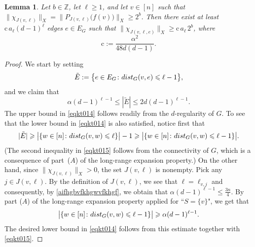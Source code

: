 \documentclass[11pt,leqno]{amsart}
\newtheorem{lemma}[theorem]{Lemma}
\theoremstyle{remark}
\theoremstyle{plain}
\newcommand{\Z}{\mathbb{Z}}
\def\dist{{\rm dist}}
\def\dist{{\rm dist}}
\begin{document}
\begin{lemma} \label{aifgvsifghvfihfgiw}
Let $b\in\Z$, let $\ell\geqslant 1$, and let $v\in [n]$ such that
$\|\chi_{J(v,\ell)}\|_X=\big\|P_{J(v,\ell)}\big(f(v)\big)\big\|_X\geqslant 2^b$.
Then there exist at least $\mathrm{c}\,a_\ell (d-1)^\ell$ edges $e\in E_G$ such that
$\|\chi_{J(v,\ell,e)}\|_X\geqslant \mathrm{c}\,a_\ell\,2^b$, where
\begin{equation} \label{eq-c1}
\mathrm{c}:= \frac{\alpha^2}{48d(d-1)}.
\end{equation}
\end{lemma}
\begin{proof}
We start by setting
$$ \tilde E:=\big\{e\in E_G\colon \dist_G(v,e)\leqslant \ell-1\big\}, $$
and we claim that
\begin{equation} \label{eqkt014}
\alpha (d-1)^{\ell-1} \leqslant  |\tilde E|\leqslant 2d(d-1)^{\ell-1}.
\end{equation}
The upper bound in \eqref{eqkt014} follows readily from the $d$-regularity of $G$. To see that the lower bound
in \eqref{eqkt014} is also satisfied, notice first that
\begin{equation} \label{eqkt015}
|\tilde E| \geqslant \big|\{w\in [n]\colon \dist_G(v,w) \leqslant \ell\}\big|-1 \geqslant
\big|\{w\in [n]\colon \dist_G(v,w) \leqslant \ell-1\}\big|.
\end{equation}
(The second inequality in \eqref{eqkt015} follows from the connectivity of $G$, which is a
consequence of part~(\hyperref[Part-A]{$A$}) of the long-range expansion property.)
On the other hand, since $\|\chi_{J(v,\ell)}\|_X>0$, the set $J(v,\ell)$ is nonempty. Pick any
$j\in J(v,\ell)$. By the definition of $J(v,\ell)$, we see that $\ell = \ell_{v,j}$ and consequently,
by \eqref{aifhgbvfkhgwvfkhgf}, we obtain that $\alpha(d-1)^{\ell-1}\leqslant \frac{3n}{4}$.
By part (\hyperref[Part-A]{$A$}) of the long-range expansion property applied for ``$S = \{v\}$", we get that
\[ \big|\{w\in [n]\colon \dist_G(v,w) \leqslant \ell-1\}\big|\geqslant \alpha(d-1)^{\ell-1}.\]
The desired lower bound in \eqref{eqkt014} follows from this estimate together with \eqref{eqkt015}.


\end{proof}
\end{document}
